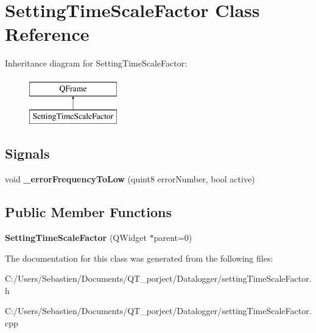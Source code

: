 \hypertarget{class_setting_time_scale_factor}{}\section{Setting\+Time\+Scale\+Factor Class Reference}
\label{class_setting_time_scale_factor}
Inheritance diagram for Setting\+Time\+Scale\+Factor\+:\begin{figure}[H]
\begin{center}
\leavevmode
\includegraphics[height=2.000000cm]{class_setting_time_scale_factor}
\end{center}
\end{figure}
\subsection*{Signals}
\begin{DoxyCompactItemize}
\item 
\mbox{\label{class_setting_time_scale_factor_a97540bb6eb81124d7c7378975c537a57}} 
void {\bfseries \+\_\+error\+Frequency\+To\+Low} (quint8 error\+Number, bool active)
\end{DoxyCompactItemize}
\subsection*{Public Member Functions}
\begin{DoxyCompactItemize}
\item 
\mbox{\label{class_setting_time_scale_factor_ab89d2c4976d3953229e0b16b383ab635}} 
{\bfseries Setting\+Time\+Scale\+Factor} (Q\+Widget $\ast$parent=0)
\end{DoxyCompactItemize}


The documentation for this class was generated from the following files\+:\begin{DoxyCompactItemize}
\item 
C\+:/\+Users/\+Sebastien/\+Documents/\+Q\+T\+\_\+porject/\+Datalogger/setting\+Time\+Scale\+Factor.\+h\item 
C\+:/\+Users/\+Sebastien/\+Documents/\+Q\+T\+\_\+porject/\+Datalogger/setting\+Time\+Scale\+Factor.\+cpp\end{DoxyCompactItemize}
